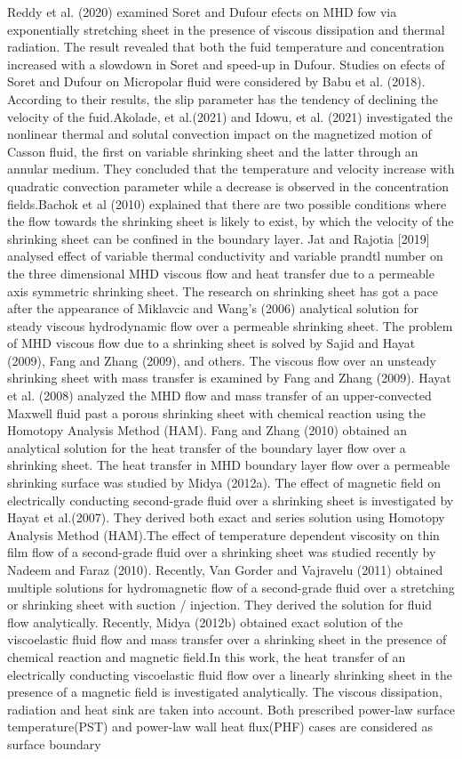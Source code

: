 \documentclass[a4paper,12pt]{report}
\begin{document}
{Reddy et  al. (2020) examined Soret and Dufour efects on MHD fow via exponentially stretching sheet in the presence of viscous dissipation and thermal radiation. The result revealed that both the fuid temperature and concentration increased with a slowdown in Soret and speed-up in Dufour. Studies on efects of Soret and Dufour on Micropolar fluid were considered by Babu et al. (2018). According to their results, the slip parameter has the tendency of declining the velocity of the fuid.Akolade, et al.(2021) and Idowu, et al. (2021) investigated the nonlinear thermal and solutal convection impact on the magnetized motion of Casson fluid, the first on variable shrinking sheet and the latter through an annular medium. They concluded that the temperature and velocity increase with quadratic convection parameter while a decrease is observed in the concentration fields.Bachok et al (2010) explained that there are two possible conditions where the flow towards the shrinking sheet is likely to exist, by which the velocity of the shrinking sheet can be confined in the boundary layer. Jat and Rajotia [2019] analysed effect of variable thermal conductivity and variable prandtl number on the three dimensional MHD viscous flow and heat transfer due to a permeable axis symmetric shrinking sheet.  The research on shrinking sheet has got a pace after the appearance of Miklavcic and Wang’s (2006) analytical solution for steady viscous hydrodynamic flow over a permeable shrinking sheet. The problem of MHD viscous flow due to a shrinking sheet is solved by Sajid and Hayat (2009), Fang and Zhang (2009), and others. The viscous flow over an unsteady shrinking sheet with mass transfer is examined by Fang and Zhang (2009). Hayat et al. (2008) analyzed the MHD flow and mass transfer of an upper-convected Maxwell fluid past a porous shrinking sheet with chemical reaction using the Homotopy Analysis Method (HAM). Fang and Zhang (2010) obtained an analytical solution for the heat transfer of the boundary layer flow over a shrinking sheet. The heat transfer in MHD boundary layer flow over a permeable shrinking surface was studied by Midya (2012a). The effect of magnetic field on electrically conducting second-grade fluid over a shrinking sheet is investigated by Hayat et al.(2007). They derived both exact and series solution using Homotopy Analysis Method (HAM).The effect of temperature dependent viscosity on thin film flow of a second-grade fluid over a shrinking sheet was studied recently by Nadeem and Faraz (2010). Recently, Van Gorder and Vajravelu (2011) obtained multiple solutions for hydromagnetic flow of a second-grade fluid over a stretching or shrinking sheet with suction / injection. They derived the solution for fluid flow analytically. Recently, Midya (2012b) obtained exact solution of the viscoelastic fluid flow and mass transfer over a shrinking sheet in the presence of chemical reaction and magnetic field.In this work, the heat transfer of an electrically conducting viscoelastic fluid flow over a linearly shrinking sheet in the presence of a magnetic field is investigated analytically. The viscous dissipation, radiation and heat sink are taken into account. Both prescribed power-law surface temperature(PST) and power-law wall heat flux(PHF) cases are considered as surface boundary }
\end{document}
